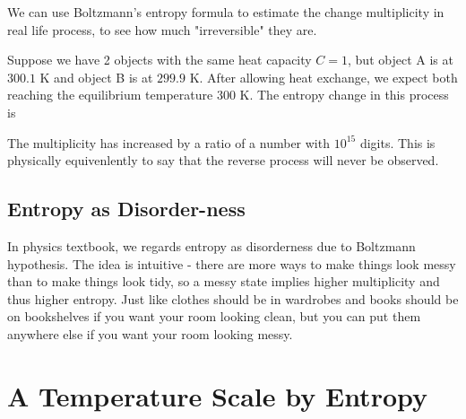 \documentclass[class=article, crop=false, 12pt]{standalone}
\begin{document}
\begin{example}
    We can use Boltzmann's entropy formula to estimate the change multiplicity in real life process,
    to see how much "irreversible" they are.

    Suppose we have 2 objects with the same heat capacity $C=1$,
    but object A is at $300.1$ K and object B is at $299.9$ K.
    After allowing heat exchange,
    we expect both reaching the equilibrium temperature $300$ K.
    The entropy change in this process is 

    The multiplicity has increased by a ratio of a number with $10^{15}$ digits.
    This is physically equivenlently to say that the reverse process will never be observed.
\end{example}

\subsection{Entropy as Disorder-ness}

In physics textbook, 
we regards entropy as disorderness due to Boltzmann hypothesis. 
The idea is intuitive - there are more ways to make things look messy than to make things look tidy, 
so a messy state implies higher multiplicity and thus higher entropy. 
Just like clothes should be in wardrobes and books should be on bookshelves if you want your room looking clean, 
but you can put them anywhere else if you want your room looking messy.



\linesep
\section{A Temperature Scale by Entropy}
\end{document}
